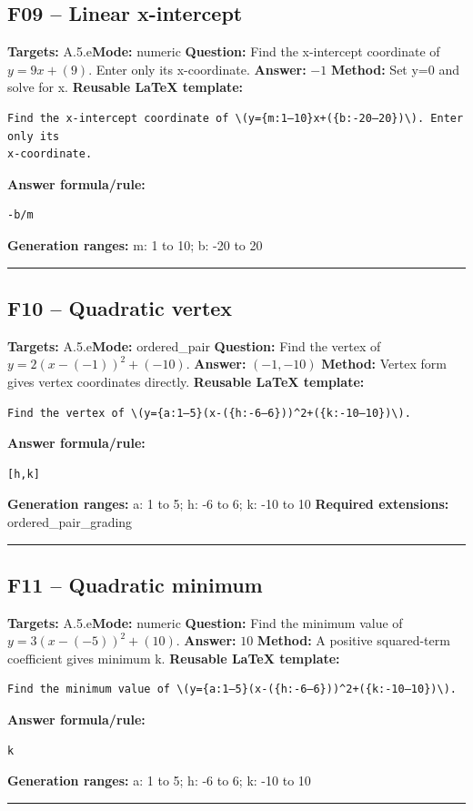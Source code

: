 \documentclass[11pt]{article}
\begin{document}
\subsection{F09 -- Linear x-intercept}
\textbf{Targets:} A.5.e\quad\textbf{Mode:} numeric
\textbf{Question:} Find the x-intercept coordinate of \(y=9x+(9)\). Enter only its x-coordinate.
\textbf{Answer:} \(-1\)
\textbf{Method:} Set y=0 and solve for x.
\textbf{Reusable LaTeX template:}
\begin{verbatim}
Find the x-intercept coordinate of \(y={m:1–10}x+({b:-20–20})\). Enter only its
x-coordinate.
\end{verbatim}
\textbf{Answer formula/rule:}
\begin{verbatim}
-b/m
\end{verbatim}
\textbf{Generation ranges:} m: 1 to 10; b: -20 to 20
\medskip\hrule\medskip
\subsection{F10 -- Quadratic vertex}
\textbf{Targets:} A.5.e\quad\textbf{Mode:} ordered\_pair
\textbf{Question:} Find the vertex of \(y=2(x-(-1))^2+(-10)\).
\textbf{Answer:} \((-1,-10)\)
\textbf{Method:} Vertex form gives vertex coordinates directly.
\textbf{Reusable LaTeX template:}
\begin{verbatim}
Find the vertex of \(y={a:1–5}(x-({h:-6–6}))^2+({k:-10–10})\).
\end{verbatim}
\textbf{Answer formula/rule:}
\begin{verbatim}
[h,k]
\end{verbatim}
\textbf{Generation ranges:} a: 1 to 5; h: -6 to 6; k: -10 to 10
\textbf{Required extensions:} ordered\_pair\_grading
\medskip\hrule\medskip
\subsection{F11 -- Quadratic minimum}
\textbf{Targets:} A.5.e\quad\textbf{Mode:} numeric
\textbf{Question:} Find the minimum value of \(y=3(x-(-5))^2+(10)\).
\textbf{Answer:} \(10\)
\textbf{Method:} A positive squared-term coefficient gives minimum k.
\textbf{Reusable LaTeX template:}
\begin{verbatim}
Find the minimum value of \(y={a:1–5}(x-({h:-6–6}))^2+({k:-10–10})\).
\end{verbatim}
\textbf{Answer formula/rule:}
\begin{verbatim}
k
\end{verbatim}
\textbf{Generation ranges:} a: 1 to 5; h: -6 to 6; k: -10 to 10
\medskip\hrule\medskip
\end{document}
